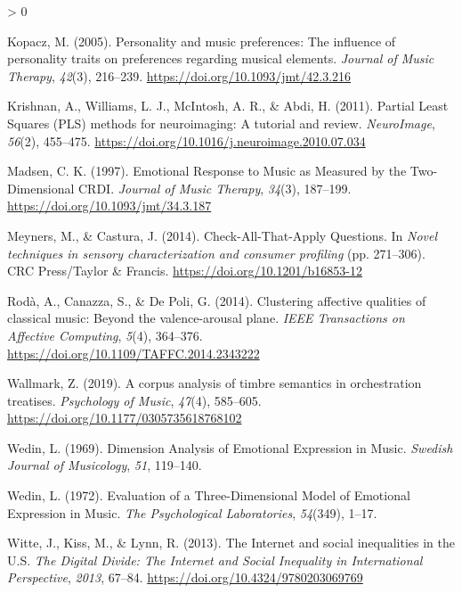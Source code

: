 \documentclass[
  english,
  man,floatsintext]{apa6}
\newlength{\cslhangindent}
\newenvironment{CSLReferences}[2] %
 {%
  \setlength{\parindent}{0pt}
  \ifodd #1 \everypar{\setlength{\hangindent}{\cslhangindent}}\ignorespaces\fi
  \ifnum #2 > 0
  \setlength{\parskip}{#2\baselineskip}
  \fi
 }%
 {}
\begin{document}
\begin{CSLReferences}{1}{0}
\leavevmode\hypertarget{ref-Kopacz2005}{}%
Kopacz, M. (2005). {Personality and music preferences: The influence of personality traits on preferences regarding musical elements}. \emph{Journal of Music Therapy}, \emph{42}(3), 216--239. \url{https://doi.org/10.1093/jmt/42.3.216}

\leavevmode\hypertarget{ref-Krishnan2011}{}%
Krishnan, A., Williams, L. J., McIntosh, A. R., \& Abdi, H. (2011). {Partial Least Squares (PLS) methods for neuroimaging: A tutorial and review}. \emph{NeuroImage}, \emph{56}(2), 455--475. \url{https://doi.org/10.1016/j.neuroimage.2010.07.034}

\leavevmode\hypertarget{ref-Madsen1997}{}%
Madsen, C. K. (1997). {Emotional Response to Music as Measured by the Two-Dimensional CRDI}. \emph{Journal of Music Therapy}, \emph{34}(3), 187--199. \url{https://doi.org/10.1093/jmt/34.3.187}

\leavevmode\hypertarget{ref-Meyners2014}{}%
Meyners, M., \& Castura, J. (2014). {Check-All-That-Apply Questions}. In \emph{Novel techniques in sensory characterization and consumer profiling} (pp. 271--306). CRC Press/Taylor {\&} Francis. \url{https://doi.org/10.1201/b16853-12}

\leavevmode\hypertarget{ref-Roda2014}{}%
Rodà, A., Canazza, S., \& De Poli, G. (2014). {Clustering affective qualities of classical music: Beyond the valence-arousal plane}. \emph{IEEE Transactions on Affective Computing}, \emph{5}(4), 364--376. \url{https://doi.org/10.1109/TAFFC.2014.2343222}

\leavevmode\hypertarget{ref-Wallmark2019}{}%
Wallmark, Z. (2019). {A corpus analysis of timbre semantics in orchestration treatises}. \emph{Psychology of Music}, \emph{47}(4), 585--605. \url{https://doi.org/10.1177/0305735618768102}

\leavevmode\hypertarget{ref-Wedin1969}{}%
Wedin, L. (1969). {Dimension Analysis of Emotional Expression in Music}. \emph{Swedish Journal of Musicology}, \emph{51}, 119--140.

\leavevmode\hypertarget{ref-Wedin1972}{}%
Wedin, L. (1972). {Evaluation of a Three-Dimensional Model of Emotional Expression in Music}. \emph{The Psychological Laboratories}, \emph{54}(349), 1--17.

\leavevmode\hypertarget{ref-Witte2013}{}%
Witte, J., Kiss, M., \& Lynn, R. (2013). {The Internet and social inequalities in the U.S}. \emph{The Digital Divide: The Internet and Social Inequality in International Perspective}, \emph{2013}, 67--84. \url{https://doi.org/10.4324/9780203069769}

\end{CSLReferences}

\endgroup
\end{document}
